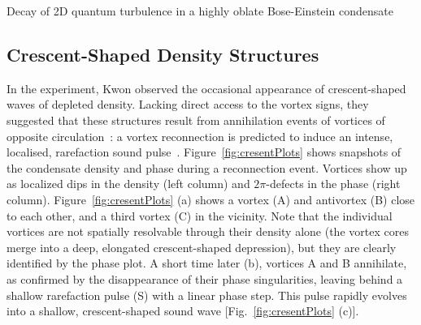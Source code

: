 \begin{chapter}{\label{cha:shin}Decay of 2D quantum turbulence in a highly oblate Bose-Einstein condensate}
\subsection{Crescent-Shaped Density Structures}
In the experiment, Kwon {\etal}observed the occasional appearance of crescent-shaped waves of 
depleted density.  Lacking direct access to the vortex signs,
they suggested that these structures result from
annihilation events of vortices of opposite 
circulation~\citep{nazarenko_onorato_07,rorai_skreenivasan_12,prabhakar_singh_13}: a vortex reconnection is predicted to 
induce an intense, localised, rarefaction 
sound pulse~\cite{leadbeater,zuccher}.  
Figure~\ref{fig:cresentPlots} shows snapshots of the condensate density 
and phase during a reconnection event. Vortices show up as localized dips 
in the density (left column) and $2 \pi$-defects in the phase (right column). 
Figure~\ref{fig:cresentPlots} (a) shows a vortex (A) and antivortex (B) 
close to each other, and a third vortex (C) in the vicinity.
Note that the individual vortices are not spatially resolvable 
through their density alone (the vortex cores merge into a deep, elongated 
crescent-shaped depression), but they are clearly identified by the 
phase plot.  A short time later (b), vortices A and B annihilate, 
as confirmed by the disappearance of their phase singularities, 
leaving behind a shallow rarefaction pulse (S) with a linear phase step.  
This pulse rapidly evolves into a shallow, 
crescent-shaped sound wave [Fig.~\ref{fig:cresentPlots} (c)].  


\end{chapter}
